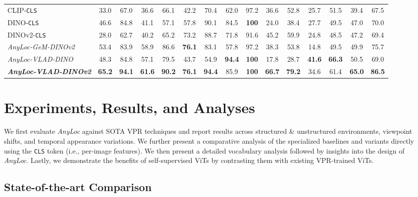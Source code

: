 \documentclass[letterpaper, 10 pt, conference]{ieeeconf}  \fi
\newcommand{\cdashmidrule}[1]{\noalign{\vskip\aboverulesep}
  \cdashline{#1}
  \noalign{\vskip\belowrulesep}}
\newcommand{\coolname}{\textit{AnyLoc}}
\newcommand{\coolagg}[2]{\textit{AnyLoc-{#1}-{#2}}}
\newcommand{\dino}{\mbox{DINO}}
\newcommand{\dinovtwo}{\mbox{DINOv2}}
\begin{document}
\begin{table*}[!t]
{\begin{tabular}{@{}lcccccccccccccc@{}}
\cdashmidrule{1-15}
CLIP-\texttt{CLS}~\cite{radford2021learning}  & 33.0 & 67.0 & 36.6 & 66.1 & 42.2 & 70.4 & 62.0 & 97.2 & 36.6 & 52.8 & 25.7 & 51.5 & 39.4 & 67.5 \\

\dino{}-\texttt{CLS}~\cite{caron2021emerging} & 46.6 & 84.8 & 41.1 & 57.1 & 57.8 & 90.1 & 84.5 & \textbf{100} & 24.0 & 38.4 & 27.7 & 49.5 & 47.0 & 70.0 \\

\dinovtwo{}-\texttt{CLS}~\cite{oquab2023dinov2} & 28.0 & 62.7 & 40.2 & 65.2 & 73.2 & 88.7 & 71.8 & 91.6 & 45.2 & 59.9 & 24.8 & 48.5 & 47.2 & 69.4 \\

\rowcolor{Light}
\coolagg{GeM}{\dinovtwo{}} & 53.4 & 83.9 & 58.9 & 86.6 & \textbf{76.1} & 83.1 & 57.8 & 97.2 & 38.3 & 53.8 & 14.8 & 49.5 & 49.9 & 75.7
\\


\rowcolor{Light}
\coolagg{VLAD}{\dino{}}  & 48.3 & 84.8 & 57.1 & 79.5 & 43.7 & 54.9 & \textbf{94.4} & \textbf{100} & 17.8 & 28.7 & \textbf{41.6} & \textbf{66.3} & 50.5 & 69.0 
\\


\rowcolor{Light}
\textbf{\coolagg{VLAD}{\dinovtwo{}}}   & \textbf{65.2} & \textbf{94.1} & \textbf{61.6} & \textbf{90.2} & \textbf{76.1} & \textbf{94.4} & 85.9 & \textbf{100} & \textbf{66.7} & \textbf{79.2} & 34.6 & 61.4 & \textbf{65.0} & \textbf{86.5}
\\

\bottomrule
\end{tabular}
}
\label{tab:unstructured}
\end{table*} 
\section{Experiments, Results, and Analyses}
\label{sec:results}

We first evaluate \coolname{} against SOTA VPR techniques and report results across structured \& unstructured environments, viewpoint shifts, and temporal appearance variations.
We further present a comparative analysis of the specialized baselines and variants directly using the \texttt{CLS} token (i.e., per-image features).
We then present a detailed vocabulary analysis followed by insights into the design of \coolname{}.
Lastly, we demonstrate the benefits of self-supervised ViTs by contrasting them with existing VPR-trained ViTs.

\subsection{State-of-the-art Comparison}
\end{document}
